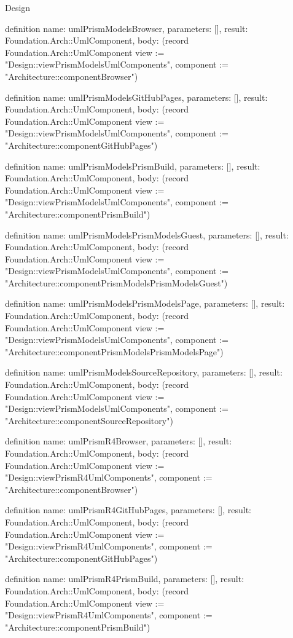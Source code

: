\begin{lexlean}{Design}
\begin{semanticmodule}
definition{
  name: umlPrismModelsBrowser,
  parameters: [],
  result: Foundation.Arch::UmlComponent,
  body: (record Foundation.Arch::UmlComponent {view := "Design::viewPrismModelsUmlComponents", component := "Architecture::componentBrowser"})
}

definition{
  name: umlPrismModelsGitHubPages,
  parameters: [],
  result: Foundation.Arch::UmlComponent,
  body: (record Foundation.Arch::UmlComponent {view := "Design::viewPrismModelsUmlComponents", component := "Architecture::componentGitHubPages"})
}

definition{
  name: umlPrismModelsPrismBuild,
  parameters: [],
  result: Foundation.Arch::UmlComponent,
  body: (record Foundation.Arch::UmlComponent {view := "Design::viewPrismModelsUmlComponents", component := "Architecture::componentPrismBuild"})
}

definition{
  name: umlPrismModelsPrismModelsGuest,
  parameters: [],
  result: Foundation.Arch::UmlComponent,
  body: (record Foundation.Arch::UmlComponent {view := "Design::viewPrismModelsUmlComponents", component := "Architecture::componentPrismModelsPrismModelsGuest"})
}

definition{
  name: umlPrismModelsPrismModelsPage,
  parameters: [],
  result: Foundation.Arch::UmlComponent,
  body: (record Foundation.Arch::UmlComponent {view := "Design::viewPrismModelsUmlComponents", component := "Architecture::componentPrismModelsPrismModelsPage"})
}

definition{
  name: umlPrismModelsSourceRepository,
  parameters: [],
  result: Foundation.Arch::UmlComponent,
  body: (record Foundation.Arch::UmlComponent {view := "Design::viewPrismModelsUmlComponents", component := "Architecture::componentSourceRepository"})
}

definition{
  name: umlPrismR4Browser,
  parameters: [],
  result: Foundation.Arch::UmlComponent,
  body: (record Foundation.Arch::UmlComponent {view := "Design::viewPrismR4UmlComponents", component := "Architecture::componentBrowser"})
}

definition{
  name: umlPrismR4GitHubPages,
  parameters: [],
  result: Foundation.Arch::UmlComponent,
  body: (record Foundation.Arch::UmlComponent {view := "Design::viewPrismR4UmlComponents", component := "Architecture::componentGitHubPages"})
}

definition{
  name: umlPrismR4PrismBuild,
  parameters: [],
  result: Foundation.Arch::UmlComponent,
  body: (record Foundation.Arch::UmlComponent {view := "Design::viewPrismR4UmlComponents", component := "Architecture::componentPrismBuild"})
}


\end{semanticmodule}
\end{lexlean}
